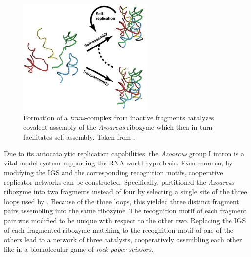 \documentclass[../../master.tex]{subfiles}
\begin{document}
\begin{figure}[!ht]
	\centering
	\includegraphics[width=0.6\textwidth]{pic/intro/notmine/hayden2006_figure2B.png}
	\caption[Self-Assembly of the \textit{Azoarcus} Group I Intron]{
		Formation of a \textit{trans}-complex from inactive fragments catalyzes covalent assembly of the \textit{Azoarcus} ribozyme which then in turn facilitates self-assembly.
		Taken from \parencite[Figure 2B]{hayden_self-assembly_2006}.
	}\label{fig:selfassembly}
\end{figure}

Due to its autocatalytic replication capabilities, the \textit{Azoarcus} group I intron is a vital model system supporting the RNA world hypothesis.
Even more so, by modifying the IGS and the corresponding recognition motifs, cooperative replicator networks can be constructed.
Specifically, \citeauthor{vaidya_spontaneous_2012} partitioned the \textit{Azoarcus} ribozyme into two fragments instead of four by selecting a single site of the three loops used by \citeauthor{hayden_self-assembly_2006} \parencite{vaidya_spontaneous_2012}.
Because of the three loops, this yielded three distinct fragment pairs assembling into the same ribozyme.
The recognition motif of each fragment pair was modified to be unique with respect to the other two. 
Replacing the IGS of each fragmented ribozyme matching to the recognition motif of one of the others lead to a network of three catalysts, cooperatively assembling each other like in a biomolecular game of \emph{rock-paper-scissors}.
\end{document}

